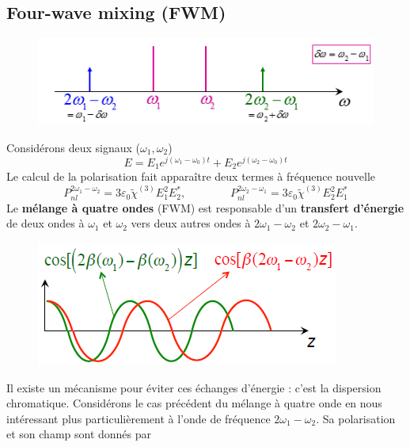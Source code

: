 \subsection{Four-wave mixing (FWM)}
\begin{figure}
	\vspace{-5mm}
	\includegraphics[scale=0.65]{ch6/image33}
	\end{figure}
Considérons deux signaux ($\omega_1, \omega_2$)
\begin{equation}
E = {E_1}{e^{j({\omega _1} - {\omega _0})t}} + {E_2}{e^{j({\omega _2} - {\omega _0})t}}
\end{equation}
Le calcul de la polarisation fait apparaître deux termes à fréquence nouvelle
\begin{equation}
P_{nl}^{2{\omega _1} - {\omega _2}} = 3{\varepsilon _0}{\tilde \chi ^{(3)}}E_1^2E_2^*,\qquad\qquad
P_{nl}^{2{\omega _2} - {\omega _1}} = 3{\varepsilon _0}{\tilde \chi ^{(3)}}E_2^2E_1^*
\end{equation}
Le \textbf{mélange à quatre ondes} (FWM) est responsable d'un \textbf{transfert d'énergie} de 
deux ondes à $\omega_1$ et $\omega_2$ vers deux autres ondes à $2\omega_1-\omega_2$ et 
$2\omega_2-\omega_1$.

\newpage
\begin{figure}
	\includegraphics[scale=0.65]{ch6/image34}
	\end{figure}
Il existe un mécanisme pour éviter ces échanges d'énergie : c'est la dispersion chromatique. 
Considérons le cas précédent du mélange à quatre onde en nous intéressant plus particulièrement
à l'onde de fréquence $2\omega_1-\omega_2$. Sa polarisation et son champ sont donnés par\\

